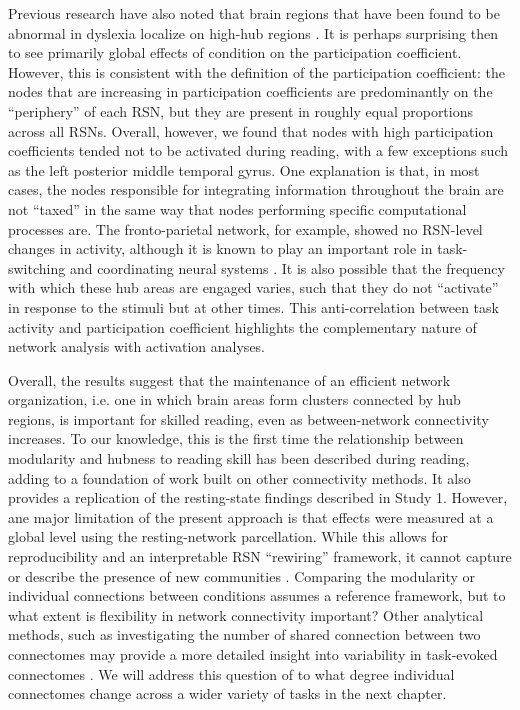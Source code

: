 Previous research have also noted that brain regions that have been found to be abnormal in dyslexia localize on high-hub regions \citep{Bailey2018}. It is perhaps surprising then to see primarily global effects of condition on the participation coefficient. However, this is consistent with the definition of the participation coefficient: the nodes that are increasing in participation coefficients are predominantly on the ``periphery'' of each RSN, but they are present in roughly equal proportions across all RSNs. Overall, however, we found that nodes with high participation coefficients tended not to be activated during reading, with a few exceptions such as the left posterior middle temporal gyrus. One explanation is that, in most cases, the nodes responsible for integrating information throughout the brain are not ``taxed'' in the same way that nodes performing specific computational processes are. The fronto-parietal network, for example, showed no RSN-level changes in activity, although it is known to play an important role in task-switching and coordinating neural systems \citep{Cole2013}. It is also possible that the frequency with which these hub areas are engaged varies, such that they do not ``activate'' in response to the stimuli but at other times. This anti-correlation between task activity and participation coefficient highlights the complementary nature of network analysis with activation analyses. 

Overall, the results suggest that the maintenance of an efficient network organization, i.e. one in which brain areas form clusters connected by hub regions, is important for skilled reading, even as between-network connectivity increases. To our knowledge, this is the first time the relationship between modularity and hubness to reading skill has been described during reading, adding to a foundation of work built on other connectivity methods. It also provides a replication of the resting-state findings described in Study 1. However, ane major limitation of the present approach is that effects were measured at a global level using the resting-network parcellation. While this allows for reproducibility and an interpretable RSN ``rewiring'' framework, it cannot capture or describe the presence of new communities \citep{Power2011}. Comparing the modularity or individual connections between conditions assumes a reference framework, but to what extent is flexibility in network connectivity important? Other analytical methods, such as investigating the number of shared connection between two connectomes may provide a more detailed insight into variability in task-evoked connectomes \citep{Petersen2015}. We will address this question of to what degree individual connectomes change across a wider variety of tasks in the next chapter.
